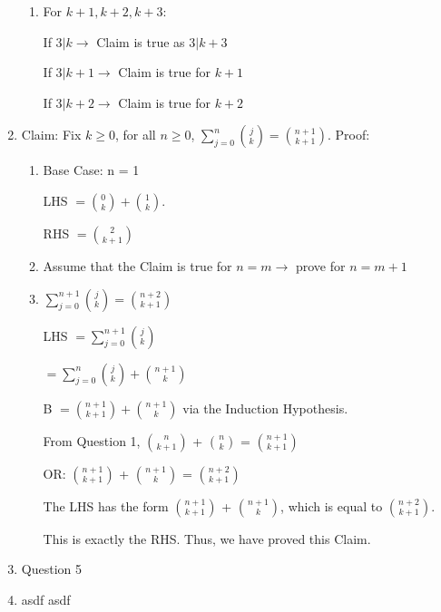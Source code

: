 \documentclass{amsart}
\begin{document}
\begin{enumerate}
\begin{flushleft}
\begin{enumerate}
    \item For $k + 1, k + 2, k + 3$:

    If $3 | k \rightarrow$ Claim is true as $3 | k + 3$

    If $3 | k + 1 \rightarrow$ Claim is true for $k + 1$

    If $3 | k + 2 \rightarrow$ Claim is true for $k + 2$
    \newline
  \end{enumerate}
  \end{flushleft}

  \item
  \begin{flushleft}
  Claim: Fix $k\geq0$, for all $n\geq0$, $\sum_{j=0}^{n}\binom{j}{k}=\binom{n+1}{k+1}$.
  Proof:
  \begin{enumerate}
    \item Base Case: n = 1

    LHS $= \binom{0}{k} + \binom{1}{k}$.

    RHS $= \binom{2}{k + 1}$

    \item Assume that the Claim is true for $n = m \rightarrow$ prove for $n = m + 1$

    \item $\sum_{j=0}^{n + 1}\binom{j}{k}=\binom{n+2}{k+1}$

    LHS $= \sum_{j=0}^{n + 1}\binom{j}{k}$

    $= \sum_{j=0}^{n}\binom{j}{k} + \binom{n + 1}{k}$

B    $= \binom{n + 1}{k + 1} + \binom{n + 1}{k}$ via the Induction Hypothesis. \newline

    From Question 1, $\binom{n}{k + 1}$ + $\binom{n}{k}$ = $\binom{n + 1}{k + 1}$

    OR: $\binom{n+ 1}{k + 1}$ + $\binom{n + 1}{k}$ = $\binom{n + 2}{k + 1}$

    The LHS has the form $\binom{n+ 1}{k + 1}$ + $\binom{n + 1}{k}$, which is equal to $\binom{n + 2}{k + 1}$.

    This is exactly the RHS. Thus, we have proved this Claim.
    \newline
  \end{enumerate}
  \end{flushleft}

  \item Question 5

  \item
  \begin{flushleft}
  asdf
  asdf
  \end{flushleft}



\end{enumerate}
\end{document}
